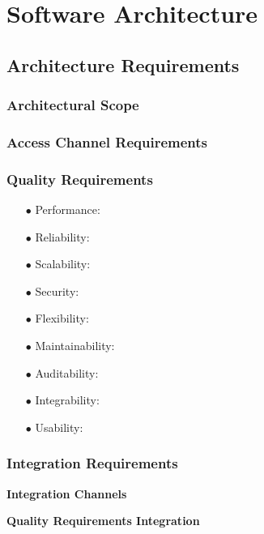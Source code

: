 \documentclass[a4paper,12pt]{article}
\begin{document}
\newpage
\section{Software Architecture}
\subsection{Architecture Requirements}
\subsubsection{Architectural Scope}

\subsubsection{Access Channel Requirements}

\subsubsection{Quality Requirements}

 \begin{itemize}
 	\item[$\bullet$]Performance: 

 	\item[$\bullet$]Reliability:  

 	\item[$\bullet$]Scalability: 

 	\item[$\bullet$]Security:

 	\item[$\bullet$]Flexibility: 

	 \item[$\bullet$]Maintainability: 

 	\item[$\bullet$]Auditability:

 	\item[$\bullet$]Integrability:
 	\item[$\bullet$]Usability:

 	 \end{itemize}

\subsubsection{Integration Requirements}
\begin{flushleft}
\textbf{Integration Channels}

\textbf{Quality Requirements Integration}

\end{flushleft}
\end{document}
